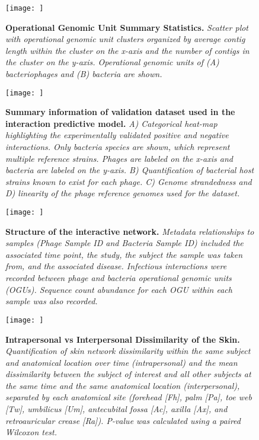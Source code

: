\documentclass[12pt,]{article}
\begin{document}
\newpage

\begin{figure}[htbp]
\centering
\texttt{[image: ]}
\caption{\textbf{Operational Genomic Unit Summary Statistics.}
\emph{Scatter plot with operational genomic unit clusters organized by
average contig length within the cluster on the x-axis and the number of
contigs in the cluster on the y-axis. Operational genomic units of (A)
bacteriophages and (B) bacteria are shown.}\label{ClusterStats}}
\end{figure}

\newpage

\begin{figure}[htbp]
\centering
\texttt{[image: ]}
\caption{\textbf{Summary information of validation dataset used in the
interaction predictive model.} \emph{A) Categorical heat-map
highlighting the experimentally validated positive and negative
interactions. Only bacteria species are shown, which represent multiple
reference strains. Phages are labeled on the x-axis and bacteria are
labeled on the y-axis. B) Quantification of bacterial host strains known
to exist for each phage. C) Genome strandedness and D) linearity of the
phage reference genomes used for the
dataset.}\label{ValidationOverview}}
\end{figure}

\newpage

\begin{figure}[htbp]
\centering
\texttt{[image: ]}
\caption{\textbf{Structure of the interactive network.} \emph{Metadata
relationships to samples (Phage Sample ID and Bacteria Sample ID)
included the associated time point, the study, the subject the sample
was taken from, and the associated disease. Infectious interactions were
recorded between phage and bacteria operational genomic units (OGUs).
Sequence count abundance for each OGU within each sample was also
recorded.}\label{NetworkDiagram}}
\end{figure}

\newpage

\begin{figure}[htbp]
\centering
\texttt{[image: ]}
\caption{\textbf{Intrapersonal vs Interpersonal Dissimilarity of the
Skin.} \emph{Quantification of skin network dissimilarity within the
same subject and anatomical location over time (intrapersonal) and the
mean dissimilarity between the subject of interest and all other
subjects at the same time and the same anatomical location
(interpersonal), separated by each anatomical site (forehead {[}Fh{]},
palm {[}Pa{]}, toe web {[}Tw{]}, umbilicus {[}Um{]}, antecubital fossa
{[}Ac{]}, axilla {[}Ax{]}, and retroauricular crease {[}Ra{]}). P-value
was calculated using a paired Wilcoxon test.}\label{allskin}}
\end{figure}
\end{document}
